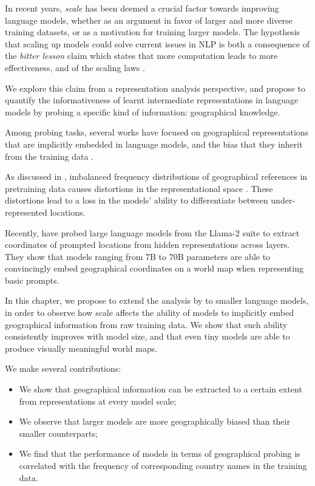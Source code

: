 In recent years, \textit{scale} has been deemed a crucial factor towards improving language models, whether as an argument in favor of larger and more diverse training datasets, or as a motivation for training larger models. The hypothesis that scaling up models could solve current issues in NLP is both a consequence of the \textit{bitter lesson} claim \citep{Sutton_2019} which states that more computation leads to more effectiveness, and of the scaling laws \citep{kaplan_scaling,chinchilla_scaling}.

We explore this claim from a representation analysis perspective, and propose to quantify the informativeness of learnt intermediate representations in language models by probing a specific kind of information: geographical knowledge. 

Among probing tasks, several works have focused on geographical representations that are implicitly embedded in language models, and the bias that they inherit from the training data \citep{lotr, faisal-anastasopoulos-2022-geographic, faisal-etal-2022-dataset}.

As discussed in , imbalanced frequency distributions of geographical references in pretraining data causes distortions in the representational space \citep{zhou2021freqbased}. These distortions lead to a loss in the models' ability to differentiate between under-represented locations.

Recently, \citet{gurnee2023language} have probed large language models from the Llama-2 suite \citep{touvron2023llama} to extract coordinates of prompted locations from hidden representations across layers. They show that models ranging from 7B to 70B parameters are able to convincingly embed geographical coordinates on a world map when representing basic prompts.

In this chapter, we propose to extend the analysis by \citet{gurnee2023language} to smaller language models, in order to observe how scale affects the ability of models to implicitly embed geographical information from raw training data. We show that such ability consistently improves with model size, and that even tiny models are able to produce visually meaningful world maps.

We make several contributions:
\begin{itemize}
    \item We show that geographical information can be extracted to a certain extent from representations at every model scale;
    \item We observe that larger models are more geographically biased than their smaller counterparts;
    \item We find that the performance of models in terms of geographical probing is correlated with the frequency of corresponding country names in the training data.
\end{itemize} 

